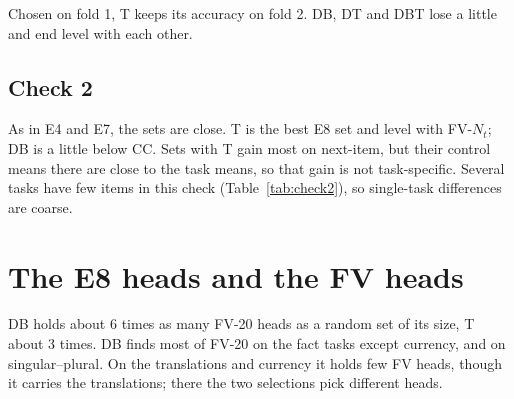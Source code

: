 \documentclass[10pt,a4paper]{article}
\begin{document}
\begin{table}[H]\centering\small

\caption{Filter choice: check-1 accuracy on fold 1 at each task's own best $\alpha$ (top 8 sets), and the same set on fold 2 at the cross-fitted $\alpha$, mean over tasks.}
\label{tab:select}
\end{table}

Chosen on fold 1, T keeps its accuracy on fold 2. DB, DT and DBT lose a little and end level with each other.

\subsection{Check 2}

\begin{table}[H]\centering\small
\resizebox{\linewidth}{!}{}
\caption{Check 2 (1-shot prompts answered wrongly), task accuracy at the cross-fitted $\alpha$, as Table~\ref{tab:check1}. All 31 sets per task: Table~\ref{tab:all2}.}
\label{tab:check2}
\end{table}

As in E4 and E7, the sets are close. T is the best E8 set and level with FV-$N_t$; DB is a little below CC. Sets with T gain most on next-item, but their control means there are close to the task means, so that gain is not task-specific. Several tasks have few items in this check (Table~\ref{tab:check2}), so single-task differences are coarse.

\section{The E8 heads and the FV heads}

\begin{table}[H]\centering\small
\resizebox{\linewidth}{!}{}
\caption{E4's FV-20 and FV-$N_t$ heads (FV-$N_t$: as many as CC, about 120) found in D, T, DB and DBT, per task, mean of the two folds; in brackets the count expected for a random set of the same size.}
\label{tab:overlap}
\end{table}

DB holds about 6 times as many FV-20 heads as a random set of its size, T about 3 times. DB finds most of FV-20 on the fact tasks except currency, and on singular--plural. On the translations and currency it holds few FV heads, though it carries the translations; there the two selections pick different heads.
\end{document}
